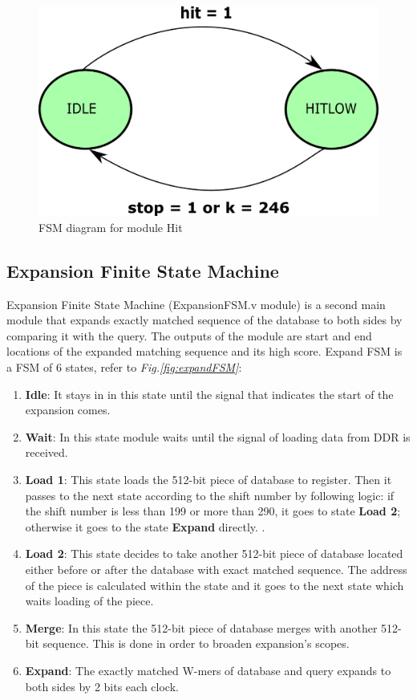 \begin{figure}[h!]
\centering
\includegraphics[width=\columnwidth]{Figures/hitFSM.pdf}
\caption{FSM diagram for module Hit} \label{fig:hitFSM}
\end{figure}



\subsection{Expansion Finite State Machine}
\quad Expansion Finite State Machine (ExpansionFSM.v module) is a second main module that expands exactly matched sequence of the database to both sides by comparing it with the query. The outputs of the module are start and end locations of the expanded matching sequence and its high score. Expand FSM is a FSM of 6 states, refer to \textit{Fig.\ref{fig:expandFSM}}:

\begin{enumerate}
  \item \textbf{Idle}: It stays in in this state until the signal that indicates the start of the expansion comes.
  \item \textbf{Wait}: In this state module waits until the signal of loading data from DDR is received. 
  \item \textbf{Load 1}: This state loads the 512-bit piece of database to register. Then it passes to the next state according to the shift number by following logic: if the shift number is less than 199 or more than 290, it goes to state \textbf{Load 2}; otherwise it goes to the state \textbf{Expand} directly. . 
  \item \textbf{Load 2}: This state decides to take another 512-bit piece of database located either before or after the database with exact matched sequence. The address of the piece is calculated within the state and it goes to the next state which waits loading of the piece. 
  \item \textbf{Merge}: In this state the 512-bit piece of database merges with another 512-bit sequence. This is done in order to broaden expansion's scopes.
  \item \textbf{Expand}: The exactly matched W-mers of database and query expands to both sides by 2 bits each clock.
\end{enumerate}


